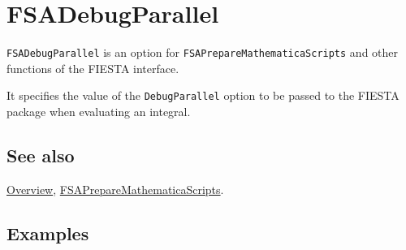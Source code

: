 \documentclass[../FeynHelpersManual.tex]{subfiles}
\begin{document}
\begin{Shaded}
\begin{Highlighting}[]
 
\end{Highlighting}
\end{Shaded}

\hypertarget{fsadebugparallel}{
\section{FSADebugParallel}\label{fsadebugparallel}}

\texttt{FSADebugParallel} is an option for
\texttt{FSAPrepareMathematicaScripts} and other functions of the FIESTA
interface.

It specifies the value of the \texttt{DebugParallel} option to be passed
to the FIESTA package when evaluating an integral.

\subsection{See also}

\hyperlink{toc}{Overview},
\hyperlink{fsapreparemathematicascripts}{FSAPrepareMathematicaScripts}.

\subsection{Examples}
\end{document}
